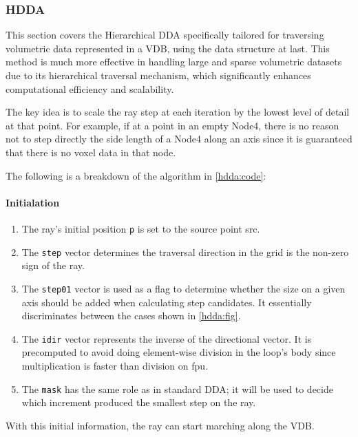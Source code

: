 \subsubsection{HDDA}
This section covers the Hierarchical DDA specifically tailored for traversing volumetric data represented in a VDB, using the data structure at last. This method is much more effective in handling large and sparse volumetric datasets due to its hierarchical traversal mechanism, which significantly enhances computational efficiency and scalability.

The key idea is to scale the ray step at each iteration by the lowest level of detail at that point. For example, if at a point in an empty Node4, there is no reason not to step directly the side length of a Node4 along an axis since it is guaranteed that there is no voxel data in that node.

The following is a breakdown of the algorithm in \cref{hdda:code}:
\paragraph{Initialation}
\begin{enumerate}
  \item The ray's initial position \texttt{p} is set to the source point src.
  \item The \texttt{step} vector determines the traversal direction in the grid is the non-zero sign of the ray.
  \item The \texttt{step01} vector is used as a flag to determine whether the size on a given axis should be added when calculating step candidates.
        It essentially discriminates between the cases shown in \cref{hdda:fig}.
  \item The \texttt{idir} vector represents the inverse of the directional vector.
        It is precomputed to avoid doing element-wise division in the loop's body since multiplication is faster than division on \acrshort{fpu}.
  \item The \texttt{mask} has the same role as in standard DDA; it will be used to decide which increment produced the smallest step on the ray.
\end{enumerate}
With this initial information, the ray can start marching along the VDB.

